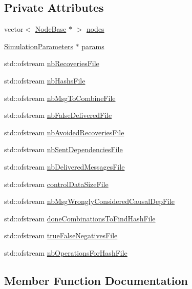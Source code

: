 \subsection*{Private Attributes}
\begin{DoxyCompactItemize}
\item 
vector$<$ \hyperlink{classNodeBase}{Node\+Base} $\ast$ $>$ \hyperlink{classStats_a815a3aa12c1529fe3d686038a2094fb2}{nodes}
\item 
\hyperlink{classSimulationParameters}{Simulation\+Parameters} $\ast$ \hyperlink{classStats_aec7570f722a5a0c6ed5f6b7208331dc1}{params}
\item 
std\+::ofstream \hyperlink{classStats_a8c4fd9f4c18e074cbc4b69d611ec4977}{nb\+Recoveries\+File}
\item 
std\+::ofstream \hyperlink{classStats_a47e0155a0aa3c62997eba6ebcdf77975}{nb\+Hashs\+File}
\item 
std\+::ofstream \hyperlink{classStats_aca527547cfdce19906610acd9a3d26ca}{nb\+Msg\+To\+Combine\+File}
\item 
std\+::ofstream \hyperlink{classStats_aded312adb1d366e759f216fc4f651b4c}{nb\+False\+Delivered\+File}
\item 
std\+::ofstream \hyperlink{classStats_a2c1cbc31715b84b8e40206c5b3dc7c5f}{nb\+Avoided\+Recoveries\+File}
\item 
std\+::ofstream \hyperlink{classStats_a26404a5110226c52970e3c261c6d8126}{nb\+Sent\+Dependencies\+File}
\item 
std\+::ofstream \hyperlink{classStats_acf354d2603af85eff78594ca27e4f189}{nb\+Delivered\+Messages\+File}
\item 
std\+::ofstream \hyperlink{classStats_ac31328205361c1581099a3ed67d5ca1a}{control\+Data\+Size\+File}
\item 
std\+::ofstream \hyperlink{classStats_a3083f3da94481b94aaa8f53742834b97}{nb\+Msg\+Wrongly\+Considered\+Causal\+Dep\+File}
\item 
std\+::ofstream \hyperlink{classStats_a3043ea15c3972ce785b42107fd9c1f5e}{done\+Combinations\+To\+Find\+Hash\+File}
\item 
std\+::ofstream \hyperlink{classStats_ac9e180c84874fabd361396f3c9a166ae}{true\+False\+Negatives\+File}
\item 
std\+::ofstream \hyperlink{classStats_a80fd6543223c0e25e2dbab085b1822f6}{nb\+Operations\+For\+Hash\+File}
\end{DoxyCompactItemize}


\subsection{Member Function Documentation}
\mbox{\label{classStats_adaf8eb884008cdcb1f8a08df41566d16}} 
